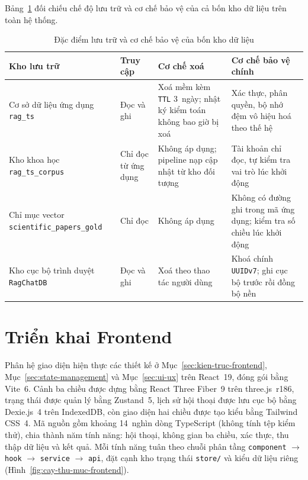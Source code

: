 Bảng~\ref{tab:dac-diem-bon-kho-ch5} đối chiếu chế độ lưu trữ và cơ chế bảo vệ của cả bốn kho dữ liệu trên toàn hệ thống.

\begin{table}[htbp]
\centering
\caption{Đặc điểm lưu trữ và cơ chế bảo vệ của bốn kho dữ liệu}
\label{tab:dac-diem-bon-kho-ch5}
\footnotesize
\setlength{\tabcolsep}{4pt}
\begin{tabularx}{\textwidth}{
  >{\raggedright\arraybackslash}p{3.6cm}
  >{\raggedright\arraybackslash}p{2.3cm}
  >{\raggedright\arraybackslash}p{4.3cm}
  >{\raggedright\arraybackslash}X
}
\toprule
\textbf{Kho lưu trữ} & \textbf{Truy cập} & \textbf{Cơ chế xoá} & \textbf{Cơ chế bảo vệ chính} \\
\midrule
Cơ sở dữ liệu ứng dụng \texttt{rag\_ts} & Đọc và ghi & Xoá mềm kèm \texttt{TTL} 3~ngày; nhật ký kiểm toán không bao giờ bị xoá & Xác thực, phân quyền, bộ nhớ đệm vô hiệu hoá theo thế hệ \\
\midrule
Kho khoa học \texttt{rag\_\allowbreak{}ts\_\allowbreak{}corpus} & Chỉ đọc từ ứng dụng & Không áp dụng; pipeline nạp cập nhật từ kho đối tượng & Tài khoản chỉ đọc, tự kiểm tra vai trò lúc khởi động \\
\midrule
Chỉ mục vector \texttt{scientific\_\allowbreak{}papers\_\allowbreak{}gold} & Chỉ đọc & Không áp dụng & Không có đường ghi trong mã ứng dụng; kiểm tra số chiều lúc khởi động \\
\midrule
Kho cục bộ trình duyệt \texttt{RagChatDB} & Đọc và ghi & Xoá theo thao tác người dùng & Khoá chính \texttt{UUIDv7}; ghi cục bộ trước rồi đồng bộ nền \\
\bottomrule
\end{tabularx}
\end{table}

\section{Triển khai Frontend}
\label{sec:trien-khai-frontend}

Phân hệ giao diện hiện thực các thiết kế ở Mục~\ref{sec:kien-truc-frontend}, Mục~\ref{sec:state-management} và Mục~\ref{sec:ui-ux} trên React~19, đóng gói bằng Vite~6. Cảnh ba chiều được dựng bằng React Three Fiber~9 trên three.js~r186, trạng thái được quản lý bằng Zustand~5, lịch sử hội thoại được lưu cục bộ bằng Dexie.js~4 trên IndexedDB, còn giao diện hai chiều được tạo kiểu bằng Tailwind CSS~4. Mã nguồn gồm khoảng 14~nghìn dòng TypeScript (không tính tệp kiểm thử), chia thành năm tính năng: hội thoại, không gian ba chiều, xác thực, thu thập dữ liệu và kết quả. Mỗi tính năng tuân theo chuỗi phân tầng \texttt{component} $\rightarrow$ \texttt{hook} $\rightarrow$ \texttt{service} $\rightarrow$ \texttt{api}, đặt cạnh kho trạng thái \texttt{store/} và kiểu dữ liệu riêng (Hình~\ref{fig:cay-thu-muc-frontend}).

